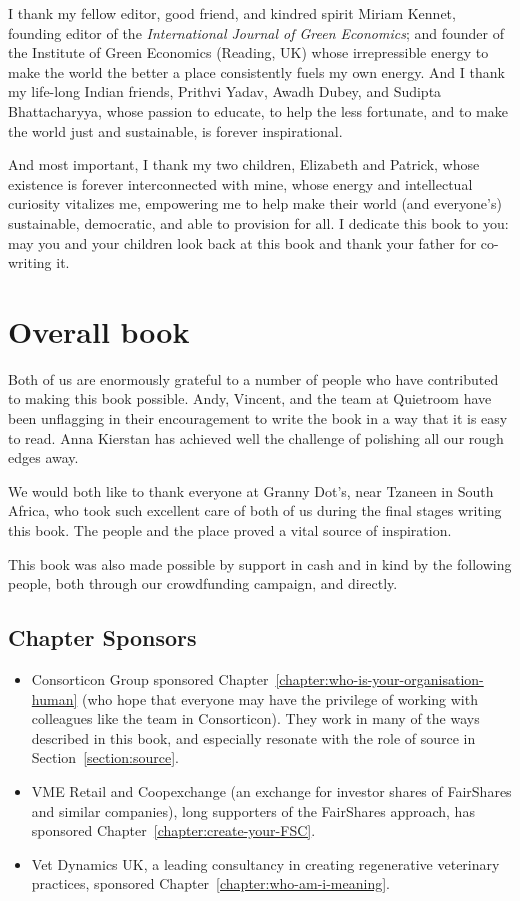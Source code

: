 I thank my fellow editor, good friend, and kindred spirit Miriam Kennet, founding editor of the \emph{International Journal of Green Economics}; and founder of the Institute  of Green Economics (Reading, UK) whose irrepressible energy to make the world the better a place consistently fuels my own energy.  And I thank my life-long Indian friends, Prithvi Yadav, Awadh Dubey, and Sudipta Bhattacharyya, whose  passion to educate, to help the less fortunate, and to make the world just and sustainable, is forever inspirational. 


And most important, I thank my two children, Elizabeth and Patrick, whose existence is forever interconnected with mine, whose energy and intellectual curiosity vitalizes me, empowering me to help make their world (and everyone’s) sustainable, democratic, and able to provision for all. I dedicate this book to you: may you and your children look back at this book and thank your father for co-writing it.  




\section*{Overall book}
Both of us are enormously grateful to a number of people who have contributed to making this book possible. Andy, Vincent, and the team at Quietroom have been unflagging in their encouragement to write the book in a way that it is easy to read. Anna Kierstan has achieved well the challenge of polishing all our rough edges away. 


We would both like to thank everyone at Granny Dot’s, near Tzaneen in South Africa, who took such excellent care of both of us during the final stages writing this book. The people and the place proved a vital source of inspiration.


This book was also made possible by support in cash and in kind by the following people, both through our crowdfunding campaign, and directly.


\clearpage


\subsection{Chapter Sponsors}
\begin{itemize}
\item Consorticon Group sponsored Chapter~\ref{chapter:who-is-your-organisation-human} (who hope that everyone may have the privilege of working with colleagues like the team in Consorticon). They  work in many of the ways described in this book, and especially resonate with the role of source in Section~\ref{section:source}.  
\item VME Retail and Coopexchange (an exchange for investor shares of FairShares and similar companies), long supporters of the FairShares approach, has sponsored Chapter~\ref{chapter:create-your-FSC}.
\item Vet Dynamics UK, a leading consultancy in creating regenerative veterinary practices, sponsored Chapter~\ref{chapter:who-am-i-meaning}.
\end{itemize}

